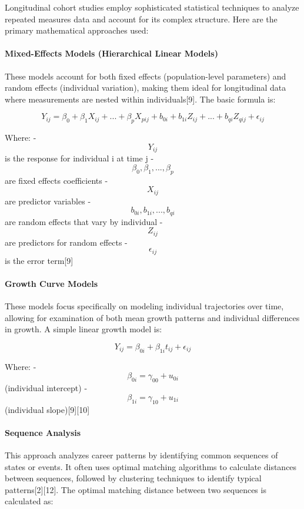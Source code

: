 \documentclass[./main.tex]{subfiles}
\begin{document}
Longitudinal cohort studies employ sophisticated statistical techniques
to analyze repeated measures data and account for its complex structure.
Here are the primary mathematical approaches used:

\paragraph{Mixed-Effects Models (Hierarchical Linear
Models)}\label{mixed-effects-models-hierarchical-linear-models}

These models account for both fixed effects (population-level
parameters) and random effects (individual variation), making them ideal
for longitudinal data where measurements are nested within
individuals{[}9{]}. The basic formula is:

\[ Y_{ij} = \beta_0 + \beta_1 X_{ij} + ... + \beta_p X_{pij} + b_{0i} + b_{1i}Z_{ij} + ... + b_{qi}Z_{qij} + \epsilon_{ij} \]

Where: - \[Y_{ij}\] is the response for individual i at time j -
\[\beta_0, \beta_1, ..., \beta_p\] are fixed effects coefficients -
\[X_{ij}\] are predictor variables - \[b_{0i}, b_{1i}, ..., b_{qi}\] are
random effects that vary by individual - \[Z_{ij}\] are predictors for
random effects - \[\epsilon_{ij}\] is the error term{[}9{]}

\paragraph{Growth Curve Models}\label{growth-curve-models}

These models focus specifically on modeling individual trajectories over
time, allowing for examination of both mean growth patterns and
individual differences in growth. A simple linear growth model is:

\[ Y_{ij} = \beta_{0i} + \beta_{1i}t_{ij} + \epsilon_{ij} \]

Where: - \[\beta_{0i} = \gamma_{00} + u_{0i}\] (individual intercept) -
\[\beta_{1i} = \gamma_{10} + u_{1i}\] (individual slope){[}9{]}{[}10{]}

\paragraph{Sequence Analysis}\label{sequence-analysis}

This approach analyzes career patterns by identifying common sequences
of states or events. It often uses optimal matching algorithms to
calculate distances between sequences, followed by clustering techniques
to identify typical patterns{[}2{]}{[}12{]}. The optimal matching
distance between two sequences is calculated as:
\end{document}
